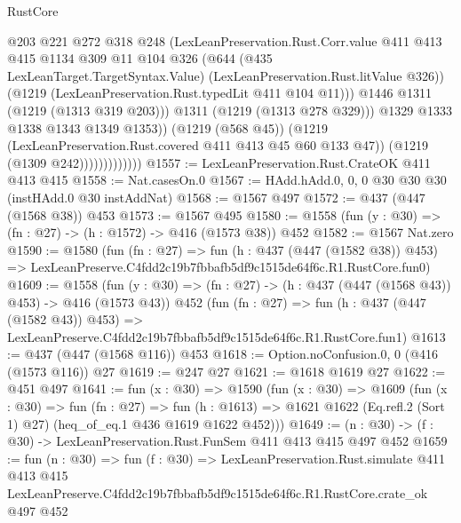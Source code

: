 \begin{lexlean}{RustCore}
\begin{coremodule}
                                  @203
                                  @221
                                  @272
                                  @318
                                  @248
                                  (LexLeanPreservation.Rust.Corr.value
                                    @411
                                    @413
                                    @415
                                    @1134
                                    @309
                                    @11
                                    @104
                                    @326
                                    (@644
                                      (@435 LexLeanTarget.TargetSyntax.Value)
                                      (LexLeanPreservation.Rust.litValue @326))
                                    (@1219 (LexLeanPreservation.Rust.typedLit @411 @104 @11)))
                                  @1446
                                  @1311
                                  (@1219 (@1313 @319 @203)))
                                @1311
                                (@1219 (@1313 @278 @329)))
                              @1329
                              @1333
                              @1338
                              @1343
                              @1349
                              @1353))
                          (@1219 (@568 @45))
                          (@1219 (LexLeanPreservation.Rust.covered @411 @413 @45 @60 @133 @47))
                          (@1219 (@1309 @242)))))))))))))
@1557 := LexLeanPreservation.Rust.CrateOK @411 @413 @415
@1558 := Nat.casesOn.{0}
@1567 := HAdd.hAdd.{0, 0, 0} @30 @30 @30 (instHAdd.{0} @30 instAddNat)
@1568 := @1567 @497
@1572 := @437 (@447 (@1568 @38)) @453
@1573 := @1567 @495
@1580 := @1558 (fun (y : @30) => (fn : @27) -> (h : @1572) -> @416 (@1573 @38)) @452
@1582 := @1567 Nat.zero
@1590 := @1580
    (fun (fn : @27) =>
    fun (h : @437 (@447 (@1582 @38)) @453) =>
    LexLeanPreserve.C4fdd2c19b7fbbafb5df9c1515de64f6c.R1.RustCore.fun0)
@1609 := @1558
    (fun (y : @30) => (fn : @27) -> (h : @437 (@447 (@1568 @43)) @453) -> @416 (@1573 @43))
    @452
    (fun (fn : @27) =>
    fun (h : @437 (@447 (@1582 @43)) @453) =>
    LexLeanPreserve.C4fdd2c19b7fbbafb5df9c1515de64f6c.R1.RustCore.fun1)
@1613 := @437 (@447 (@1568 @116)) @453
@1618 := Option.noConfusion.{0, 0} (@416 (@1573 @116)) @27
@1619 := @247 @27
@1621 := @1618 @1619 @27
@1622 := @451 @497
@1641 := fun (x : @30) =>
  @1590
    (fun (x : @30) =>
    @1609
      (fun (x : @30) =>
      fun (fn : @27) =>
      fun (h : @1613) =>
      @1621 @1622 (Eq.refl.{2} (Sort 1) @27) (heq_of_eq.{1} @436 @1619 @1622 @452)))
@1649 := (n : @30) -> (f : @30) -> LexLeanPreservation.Rust.FunSem @411 @413 @415 @497 @452
@1659 := fun (n : @30) =>
  fun (f : @30) =>
  LexLeanPreservation.Rust.simulate
    @411
    @413
    @415
    LexLeanPreserve.C4fdd2c19b7fbbafb5df9c1515de64f6c.R1.RustCore.crate_ok
    @497
    @452
\end{coremodule}
\end{lexlean}
